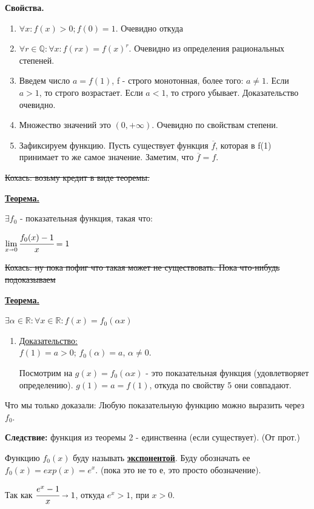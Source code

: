 \documentclass{article}
\newcommand{\deff}[1]{\underline{\textbf{#1}}}
\newcommand{\thmm}[1]{\underline{\textbf{#1}}}
\newcommand{\prooff}[1]{{\underline{Доказательство:}} \\ }
\begin{document}
\textbf{Свойства.}

\begin{enumerate}
    \item $\forall x: f(x) > 0; f(0) = 1$. Очевидно откуда
    \item $\forall r \in \mathbb{Q}: \forall x: f(rx) = f(x)^r$. Очевидно из определения рациональных степеней.
    \item Введем число $a=f(1)$,  f - строго монотонная, более того: $a\neq 1$. Если $a>1$,  то строго возрастает. Если $a<1$, то строго убывает. Доказательство очевидно.
    \item Множество значений это $(0,+\infty)$. Очевидно по свойствам степени.  
    \item Зафиксируем функцию. Пусть существует функция $\overline{f}$, которая в f(1) принимает то же самое значение. Заметим, что $\overline{f}=f$.
\end{enumerate}
    


\sout{Кохась: возьму кредит в виде теоремы.}

\thmm{Теорема.}

$\exists f_0$ - показательная  функция, такая что:

$\lim\limits_{x \shortrightarrow 0} \cfrac{f_0(x)-1}{x}=1$

\sout{Кохась: ну пока пофиг что такая может не  существовать. Пока что-нибудь подоказываем }

\thmm{Теорема.}

$\exists \alpha \in \mathbb{R}: \forall x \in \mathbb{R}: f(x)=f_0(\alpha x)$


\begin{enumerate}
    \item[] \prooff{}
     $f(1) = a > 0$; $f_0(\alpha) = a$, $\alpha \neq 0$.

     Посмотрим на $g(x) = f_0(\alpha x)$ -  это показательная функция (удовлетворяет определению). $g(1) = a = f(1)$, откуда по свойству 5 они совпадают. 
\end{enumerate}

Что мы только доказали: Любую показательную функцию можно выразить через $f_0$.

\textbf{Следствие:} функция из теоремы 2 - единственна (если существует). (От прот.)

Функцию $f_0(x)$ буду называть \deff{экспонентой}. Буду обозначать ее $f_0(x) = exp(x) = e^x$. (пока это не то е, это просто обозначение). 

Так как $\cfrac{e^x - 1}{x}\shortrightarrow 1$, откуда $e^x >1$, при $x>0$.
\end{document}
